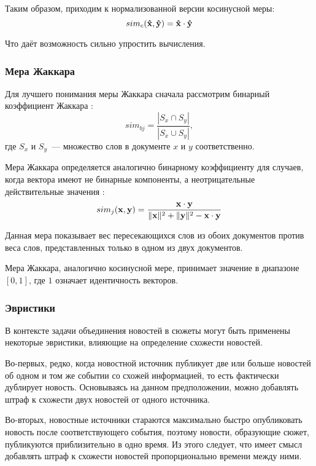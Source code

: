 Таким образом, приходим к нормализованной версии косинусной меры:
\begin{equation}
    sim_c(\boldsymbol{\mathbf{\hat{x}}},\boldsymbol{\mathbf{\hat{y}}})=\boldsymbol{\mathbf{\hat{x}}}\cdot\boldsymbol{\mathbf{\hat{y}}}
\end{equation}

Что даёт возможность сильно упростить вычисления.

\subsubsection{Мера Жаккара}
Для лучшего понимания меры Жаккара сначала рассмотрим бинарный коэффициент Жаккара \cite{strehl02}:
\begin{equation}
    sim_{bj}=\frac{|S_x\cap S_y|}{|S_x\cup S_y|},
\end{equation}
где $S_x$ и $S_y$~--- множество слов в документе $x$ и $y$ соответственно.

Мера Жаккара определяется аналогично бинарному коэффициенту для случаев, когда вектора имеют не бинарные компоненты, а неотрицательные действительные значения \cite{manning09}:
\begin{equation}
    sim_j(\boldsymbol{\mathbf{x}},\boldsymbol{\mathbf{y}})=\frac{\boldsymbol{\mathbf{x}}\cdot\boldsymbol{\mathbf{y}}}{\lVert\boldsymbol{\mathbf{x}}\rVert^2 + \lVert\boldsymbol{\mathbf{y}}\rVert^2-\boldsymbol{\mathbf{x}}\cdot\boldsymbol{\mathbf{y}}}
\end{equation}

Данная мера показывает вес пересекающихся слов из обоих документов против веса слов, представленных только в одном из двух документов.

Мера Жаккара, аналогично косинусной мере, принимает значение в диапазоне $[0,1]$, где $1$ означает идентичность векторов.

\subsubsection{Эвристики}
В контексте задачи объединения новостей в сюжеты могут быть применены некоторые эвристики, влияющие на определение схожести новостей.

Во-первых, редко, когда новостной источник публикует две или больше новостей об одном и том же событии со схожей информацией, то есть фактически дублирует новость. Основываясь на данном предположении, можно добавлять штраф к схожести двух новостей от одного источника.

Во-вторых, новостные источники стараются максимально быстро опубликовать новость после соответствующего события, поэтому новости, образующие сюжет, публикуются приблизительно в одно время. Из этого следует, что имеет смысл добавлять штраф к схожести новостей пропорционально времени между ними.

